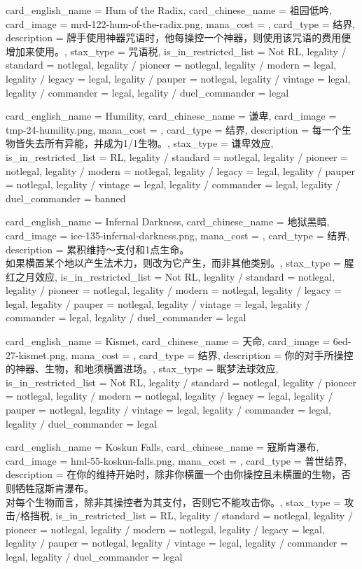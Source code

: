 \documentclass[lang = cn, color = black, 10pt]{AllThatStax}
\begin{document}
\card
{
	card_english_name = {Hum of the Radix},
	card_chinese_name = {祖园低吟},
	card_image = mrd-122-hum-of-the-radix.png,
	mana_cost = ,
	card_type = 结界,
	description = {牌手使用神器咒语时，他每操控一个神器，则使用该咒语的费用便增加来使用。},
	stax_type = 咒语税,
	is_in_restricted_list = Not RL,
	legality / standard = notlegal,
	legality / pioneer = notlegal,
	legality / modern = legal,
	legality / legacy = legal,
	legality / pauper = notlegal,
	legality / vintage = legal,
	legality / commander = legal,
	legality / duel_commander = legal
}

\card
{
	card_english_name = {Humility},
	card_chinese_name = {谦卑},
	card_image = tmp-24-humility.png,
	mana_cost = ,
	card_type = 结界,
	description = {每一个生物皆失去所有异能，并成为1/1生物。},
	stax_type = 谦卑效应,
	is_in_restricted_list = RL,
	legality / standard = notlegal,
	legality / pioneer = notlegal,
	legality / modern = notlegal,
	legality / legacy = legal,
	legality / pauper = notlegal,
	legality / vintage = legal,
	legality / commander = legal,
	legality / duel_commander = banned
}

\card
{
	card_english_name = {Infernal Darkness},
	card_chinese_name = {地狱黑暗},
	card_image = ice-135-infernal-darkness.png,
	mana_cost = ,
	card_type = 结界,
	description = {累积维持～支付和1点生命。\\
如果横置某个地以产生法术力，则改为它产生，而非其他类别。},
	stax_type = 腥红之月效应,
	is_in_restricted_list = Not RL,
	legality / standard = notlegal,
	legality / pioneer = notlegal,
	legality / modern = notlegal,
	legality / legacy = legal,
	legality / pauper = notlegal,
	legality / vintage = legal,
	legality / commander = legal,
	legality / duel_commander = legal
}

\card
{
	card_english_name = {Kismet},
	card_chinese_name = {天命},
	card_image = 6ed-27-kismet.png,
	mana_cost = ,
	card_type = 结界,
	description = {你的对手所操控的神器、生物，和地须横置进场。},
	stax_type = 眠梦法球效应,
	is_in_restricted_list = Not RL,
	legality / standard = notlegal,
	legality / pioneer = notlegal,
	legality / modern = notlegal,
	legality / legacy = legal,
	legality / pauper = notlegal,
	legality / vintage = legal,
	legality / commander = legal,
	legality / duel_commander = legal
}

\card
{
	card_english_name = {Koskun Falls},
	card_chinese_name = {寇斯肯瀑布},
	card_image = hml-55-koskun-falls.png,
	mana_cost = ,
	card_type = 普世结界,
	description = {在你的维持开始时，除非你横置一个由你操控且未横置的生物，否则牺牲寇斯肯瀑布。\\
对每个生物而言，除非其操控者为其支付，否则它不能攻击你。},
	stax_type = 攻击/格挡税,
	is_in_restricted_list = RL,
	legality / standard = notlegal,
	legality / pioneer = notlegal,
	legality / modern = notlegal,
	legality / legacy = legal,
	legality / pauper = notlegal,
	legality / vintage = legal,
	legality / commander = legal,
	legality / duel_commander = legal
}
\end{document}
